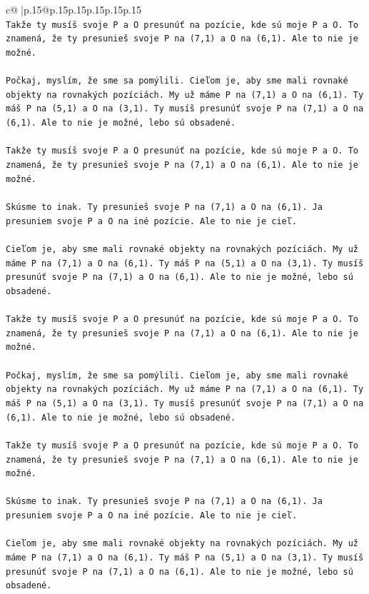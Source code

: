 \documentclass{article}
\begin{document}
{\begin{supertabular}{c@{$\;$}|p{.15\linewidth}@{}p{.15\linewidth}p{.15\linewidth}p{.15\linewidth}p{.15\linewidth}p{.15\linewidth}}
{{{\\ 
\texttt{Takže ty musíš svoje P a O presunúť na pozície, kde sú moje P a O. To znamená, že ty presunieš svoje P na (7,1) a O na (6,1). Ale to nie je možné.} \\
\\ 
\texttt{Počkaj, myslím, že sme sa pomýlili. Cieľom je, aby sme mali rovnaké objekty na rovnakých pozíciách. My už máme P na (7,1) a O na (6,1). Ty máš P na (5,1) a O na (3,1). Ty musíš presunúť svoje P na (7,1) a O na (6,1). Ale to nie je možné, lebo sú obsadené.} \\
\\ 
\texttt{Takže ty musíš svoje P a O presunúť na pozície, kde sú moje P a O. To znamená, že ty presunieš svoje P na (7,1) a O na (6,1). Ale to nie je možné.} \\
\\ 
\texttt{Skúsme to inak. Ty presunieš svoje P na (7,1) a O na (6,1). Ja presuniem svoje P a O na iné pozície. Ale to nie je cieľ.} \\
\\ 
\texttt{Cieľom je, aby sme mali rovnaké objekty na rovnakých pozíciách. My už máme P na (7,1) a O na (6,1). Ty máš P na (5,1) a O na (3,1). Ty musíš presunúť svoje P na (7,1) a O na (6,1). Ale to nie je možné, lebo sú obsadené.} \\
\\ 
\texttt{Takže ty musíš svoje P a O presunúť na pozície, kde sú moje P a O. To znamená, že ty presunieš svoje P na (7,1) a O na (6,1). Ale to nie je možné.} \\
\\ 
\texttt{Počkaj, myslím, že sme sa pomýlili. Cieľom je, aby sme mali rovnaké objekty na rovnakých pozíciách. My už máme P na (7,1) a O na (6,1). Ty máš P na (5,1) a O na (3,1). Ty musíš presunúť svoje P na (7,1) a O na (6,1). Ale to nie je možné, lebo sú obsadené.} \\
\\ 
\texttt{Takže ty musíš svoje P a O presunúť na pozície, kde sú moje P a O. To znamená, že ty presunieš svoje P na (7,1) a O na (6,1). Ale to nie je možné.} \\
\\ 
\texttt{Skúsme to inak. Ty presunieš svoje P na (7,1) a O na (6,1). Ja presuniem svoje P a O na iné pozície. Ale to nie je cieľ.} \\
\\ 
\texttt{Cieľom je, aby sme mali rovnaké objekty na rovnakých pozíciách. My už máme P na (7,1) a O na (6,1). Ty máš P na (5,1) a O na (3,1). Ty musíš presunúť svoje P na (7,1) a O na (6,1). Ale to nie je možné, lebo sú obsadené.} \\
}}}
\end{supertabular}}
\end{document}
